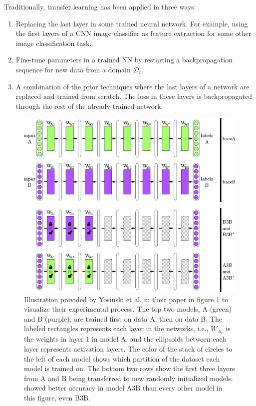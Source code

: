 Traditionally, transfer learning has been applied in three ways: 
\begin{enumerate}  
    \item Replacing the last layer in some trained neural network. For example, using the first layers of a CNN image classifier as feature extraction for some other image classification task. 
    \item Fine-tune parameters in a trained NN by restarting a backpropagation sequence for new data from a domain \(\mathcal{D}_{t}\).
    \item A combination of the prior techniques where the last layers of a network are replaced and trained from scratch. The loss in these layers is backpropagated through the rest of the already trained network.
\end{enumerate}


\begin{figure}[ht] 
    \centering
    \includegraphics[width=\linewidth]{Chapters/2.Background/figures/transfer_experiment.png}
    \caption[Transfer learning experiment]{Illustration provided by Yosinski et al. in their paper\cite{yosinski2014transferable} in figure 1 to visualize their experimental process. The top two models, A (green) and B (purple), are trained first on data A, then on data B. The labeled rectangles represents each layer in the networks, i.e., \(W_{A_{1}}\) is the weights in layer 1 in model A, and the ellipsoids between each layer represents activation layers. The color of the stack of circles to the left of each model shows which partition of the dataset each model is trained on. The bottom two rows show the first three layers from A and B being transferred to new randomly initialized models. \cite{yosinski2014transferable} showed better accuracy in model A3B than every other model in this figure, even B3B.}
    \label{fig:transferexperiment}
\end{figure}

